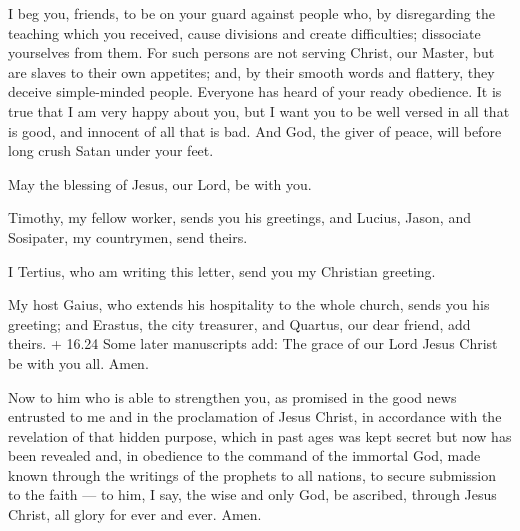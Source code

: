  I beg you, friends, to be on your guard against people
who, by disregarding the teaching which you received, cause divisions
and create difficulties; dissociate yourselves from them. 
For such persons are not serving Christ, our Master, but are slaves to
their own appetites; and, by their smooth words and flattery, they
deceive simple-minded people.  Everyone has heard of your
ready obedience. It is true that I am very happy about you, but I want
you to be well versed in all that is good, and innocent of all that is
bad.  And God, the giver of peace, will before long crush
Satan under your feet.

May the blessing of Jesus, our Lord, be with you.

 Timothy, my fellow worker, sends you his greetings, and
Lucius, Jason, and Sosipater, my countrymen, send theirs.

 I Tertius, who am writing this letter, send you my
Christian greeting.

 My host Gaius, who extends his hospitality to the whole
church, sends you his greeting; and Erastus, the city treasurer, and
Quartus, our dear friend, add theirs.  + 16.24 Some later
manuscripts add: The grace of our Lord Jesus Christ be with you all.
Amen.

 Now to him who is able to strengthen you, as promised in
the good news entrusted to me and in the proclamation of Jesus Christ,
in accordance with the revelation of that hidden purpose, which in past
ages was kept secret but now has been revealed  and, in
obedience to the command of the immortal God, made known through the
writings of the prophets to all nations, to secure submission to the
faith ---  to him, I say, the wise and only God, be
ascribed, through Jesus Christ, all glory for ever and ever. Amen.
